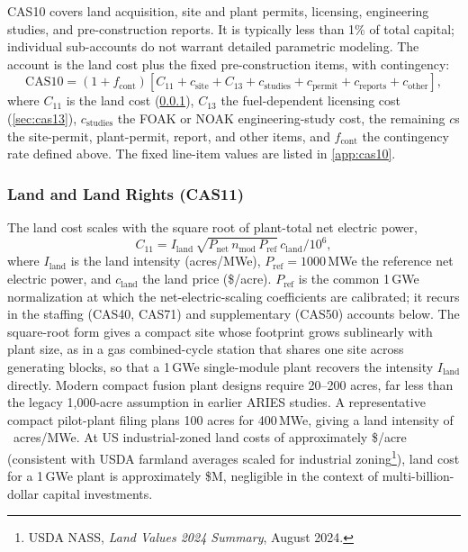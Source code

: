 \documentclass{article}
\begin{document}
CAS10 covers land acquisition, site and plant permits, licensing,
engineering studies, and pre-construction reports. It is typically less
than 1\% of total capital; individual sub-accounts do not warrant
detailed parametric modeling. The account is the land cost plus the fixed
pre-construction items, with contingency:
\begin{equation}
\label{eq:cas10}
\text{CAS10} = (1 + f_{\text{cont}})\left[
  C_{11} + c_{\text{site}} + C_{13} + c_{\text{studies}}
  + c_{\text{permit}} + c_{\text{reports}} + c_{\text{other}}
\right],
\end{equation}
where $C_{11}$ is the land cost (\cref{sec:cas11}), $C_{13}$ the
fuel-dependent licensing cost (\cref{sec:cas13}), $c_{\text{studies}}$ the FOAK or NOAK
engineering-study cost, the remaining $c$s the site-permit, plant-permit,
report, and other items, and $f_{\text{cont}}$ the contingency rate
defined above. The fixed line-item values are listed in \cref{app:cas10}.

\subsubsection{Land and Land Rights (CAS11)}
\label{sec:cas11}
The land cost scales with the square root of plant-total net electric
power,
\begin{equation}
\label{eq:cas11}
C_{11} = I_{\text{land}}\, \sqrt{P_{\text{net}}\, n_{\text{mod}}\, P_{\text{ref}}}\, c_{\text{land}}/10^6,
\end{equation}
where $I_{\text{land}}$ is the land intensity (acres/MWe), $P_{\text{ref}}
= 1000$\,MWe the reference net electric power, and $c_{\text{land}}$ the
land price (\$/acre). $P_{\text{ref}}$ is the common 1\,GWe normalization
at which the net-electric-scaling coefficients are calibrated; it recurs in
the staffing (CAS40, CAS71) and supplementary (CAS50) accounts below. The
square-root form gives a compact site whose footprint grows sublinearly
with plant size, as in a gas combined-cycle station that shares one site
across generating blocks, so that a 1\,GWe single-module plant recovers the
intensity $I_{\text{land}}$ directly. Modern compact fusion plant designs require
20--200 acres, far less than the legacy 1{,}000-acre assumption in earlier
ARIES studies. A representative compact pilot-plant filing \citep{cfs_arc}
plans 100 acres for 400\,MWe, giving a land intensity of
~acres/MWe. At US
industrial-zoned land costs of approximately
\$/acre
(consistent with USDA farmland averages scaled for
industrial zoning\footnote{USDA NASS, \emph{Land Values 2024 Summary}, August 2024.}), land cost for a 1\,GWe plant is approximately
\$M, negligible in the context of multi-billion-dollar capital
investments.
\end{document}
